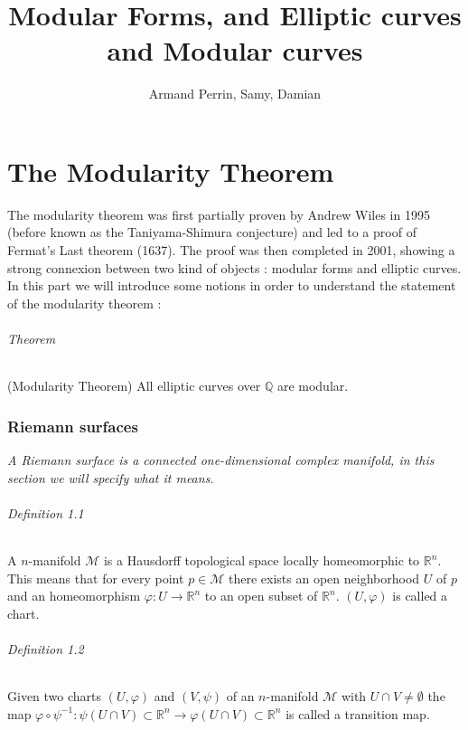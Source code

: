 \documentclass[letterpaper,10pt]{article}
\title{Modular Forms, and Elliptic curves and Modular curves}
\author{Armand Perrin, Samy, Damian}
\begin{document}
\maketitle%
\part{The Modularity Theorem}

The modularity theorem was first partially proven by Andrew Wiles in 1995 (before known as the Taniyama-Shimura conjecture) 
and led to a proof of Fermat's Last theorem (1637). The proof was then completed in 2001, showing a strong connexion between 
two kind of objects : modular forms and elliptic curves. In this part we will introduce some notions in order to understand 
the statement of the modularity theorem : 

\paragraph{Theorem } (Modularity Theorem) All elliptic curves over $\mathbb{Q}$ are modular.



\section{Riemann surfaces}%
{\itshape A Riemann surface is a connected one-dimensional complex manifold, in this section we will specify what it means.}

\paragraph{Definition 1.1} A $n$-manifold $\mathcal{M}$ is a Hausdorff topological space locally homeomorphic to $\mathbb{R}^n$.
This means that for every point $p \in \mathcal{M}$ there exists an open neighborhood $U$ of $p$ and an homeomorphism $\varphi : U \to \mathbb{R}^n$ to an open subset
of $\mathbb{R}^n$. $(U,\varphi)$ is called a chart.


\paragraph{Definition 1.2} Given two charts $(U,\varphi)$ and $(V,\psi)$ of an $n$-manifold $\mathcal{M}$ with $U\cap V \neq \emptyset$ the map
$\varphi \circ \psi^{-1} : \psi(U\cap V) \subset \mathbb{R}^n \to \varphi(U\cap V) \subset \mathbb{R}^n$ is called a transition map.
\end{document}
